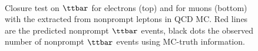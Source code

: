 \begin{figure}[h!]
\noindent
{}\\
\caption{Closure test on $\ttbar$ for electrons (top) and for muons
  (bottom) with the \fr extracted from nonprompt leptons in QCD MC. Red lines are the predicted nonprompt $\ttbar$ events, black dots the observed number of nonprompt $\ttbar$ events using MC-truth information.}
\label{fig:closures2_ele}
\end{figure}
